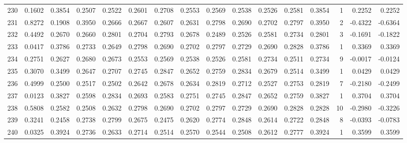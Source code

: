 \begin{tabular}{lrrrrrrrrrrrrrrr}
230 &      0.1602 &  0.3854 &  0.2507 &  0.2522 &  0.2601 &  0.2708 &  0.2553 &  0.2569 &  0.2538 &  0.2526 &   0.2581 &     0.3854 &      1 &                    0.2252 &                     0.2252 \\
231 &      0.8272 &  0.1908 &  0.3950 &  0.2666 &  0.2667 &  0.2607 &  0.2631 &  0.2798 &  0.2690 &  0.2702 &   0.2797 &     0.3950 &      2 &                   -0.4322 &                    -0.6364 \\
232 &      0.4492 &  0.2670 &  0.2660 &  0.2801 &  0.2704 &  0.2793 &  0.2678 &  0.2489 &  0.2526 &  0.2581 &   0.2734 &     0.2801 &      3 &                   -0.1691 &                    -0.1822 \\
233 &      0.0417 &  0.3786 &  0.2733 &  0.2649 &  0.2798 &  0.2690 &  0.2702 &  0.2797 &  0.2729 &  0.2690 &   0.2828 &     0.3786 &      1 &                    0.3369 &                     0.3369 \\
234 &      0.2751 &  0.2627 &  0.2680 &  0.2673 &  0.2553 &  0.2569 &  0.2538 &  0.2526 &  0.2581 &  0.2734 &   0.2511 &     0.2734 &      9 &                   -0.0017 &                    -0.0124 \\
235 &      0.3070 &  0.3499 &  0.2647 &  0.2707 &  0.2745 &  0.2847 &  0.2652 &  0.2759 &  0.2834 &  0.2679 &   0.2514 &     0.3499 &      1 &                    0.0429 &                     0.0429 \\
236 &      0.4999 &  0.2500 &  0.2517 &  0.2502 &  0.2642 &  0.2678 &  0.2634 &  0.2819 &  0.2712 &  0.2527 &   0.2753 &     0.2819 &      7 &                   -0.2180 &                    -0.2499 \\
237 &      0.0123 &  0.3827 &  0.2598 &  0.2834 &  0.2693 &  0.2583 &  0.2751 &  0.2745 &  0.2847 &  0.2652 &   0.2759 &     0.3827 &      1 &                    0.3704 &                     0.3704 \\
238 &      0.5808 &  0.2582 &  0.2508 &  0.2632 &  0.2798 &  0.2690 &  0.2702 &  0.2797 &  0.2729 &  0.2690 &   0.2828 &     0.2828 &     10 &                   -0.2980 &                    -0.3226 \\
239 &      0.3241 &  0.2458 &  0.2738 &  0.2799 &  0.2675 &  0.2475 &  0.2620 &  0.2774 &  0.2848 &  0.2614 &   0.2722 &     0.2848 &      8 &                   -0.0393 &                    -0.0783 \\
240 &      0.0325 &  0.3924 &  0.2736 &  0.2633 &  0.2714 &  0.2514 &  0.2570 &  0.2544 &  0.2508 &  0.2612 &   0.2777 &     0.3924 &      1 &                    0.3599 &                     0.3599 \\

\end{tabular}
